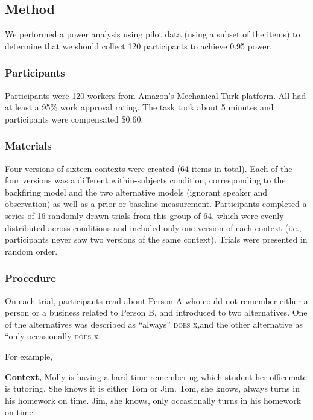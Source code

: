 \documentclass[10pt,letterpaper]{article}
\begin{document}
\subsection{Method}

We performed a power analysis using pilot data (using a subset of the items) to determine that we should collect 120 participants to achieve 0.95 power. 

\subsubsection{Participants}

Participants were 120 workers from Amazon's Mechanical Turk platform. 
All had at least a 95\% work approval rating.
The task took about 5 minutes and participants were compensated \$0.60.

\subsubsection{Materials}

Four versions of sixteen contexts were created (64 items in total). 
Each of the four versions was a different within-subjects condition, corresponding to the backfiring model and the two alternative models (ignorant speaker and observation) as well as a prior or baseline measurement. 
Participants completed a series of 16 randomly drawn trials from this group of 64, which were evenly distributed across conditions and included only one version of each context (i.e., participants never saw two versions of the same context).  
Trials were presented in random order.

\subsubsection{Procedure}

On each trial, participants read about Person A who could not remember either a person or a business related to Person B, and introduced to two alternatives. 
One of the alternatives was described as ``always'' \textsc{does x},and the other alternative as ``only occasionally \textsc{does x}. 

For example,

\textbf{Context,} Molly is having a hard time remembering which student her officemate is tutoring.  
She knows it is either Tom or Jim. 
Tom, she knows, always turns in his homework on time.  
Jim, she knows, only occasionally turns in his homework on time.
\end{document}
